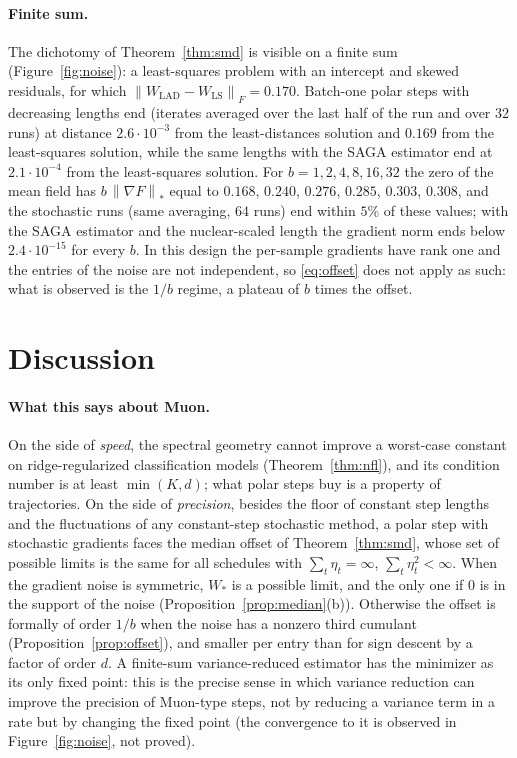 \documentclass[11pt]{article}
\newcommand{\nnuc}[1]{\left\|#1\right\|_{*}}
\newcommand{\nF}[1]{\left\|#1\right\|_{F}}
\begin{document}
\paragraph{Finite sum.} The dichotomy of Theorem~\ref{thm:smd} is visible on a finite sum
(Figure~\ref{fig:noise}): a least-squares problem with an intercept and skewed residuals, for which
$\nF{W_{\mathrm{LAD}}-W_{\mathrm{LS}}}=0.170$. Batch-one polar steps with decreasing lengths end (iterates averaged
over the last half of the run and over $32$ runs) at distance $2.6\cdot10^{-3}$ from the least-distances solution and
$0.169$ from the least-squares solution, while the same lengths with the SAGA estimator end at $2.1\cdot10^{-4}$ from
the least-squares solution. For $b=1,2,4,8,16,32$ the zero of the mean field has $b\,\nnuc{\nabla F}$ equal to
$0.168$, $0.240$, $0.276$, $0.285$, $0.303$, $0.308$, and the stochastic runs (same averaging, $64$ runs) end within
$5\%$ of these values; with the SAGA estimator and the nuclear-scaled length the gradient norm ends below
$2.4\cdot10^{-15}$ for every $b$. In this design the per-sample gradients have rank one and the entries of the noise
are not independent, so \eqref{eq:offset} does not apply as such: what is observed is the $1/b$ regime, a plateau of
$b$ times the offset.

\section{Discussion}\label{sec:discussion}

\paragraph{What this says about Muon.} On the side of \emph{speed}, the spectral geometry cannot improve a worst-case
constant on ridge-regularized classification models (Theorem~\ref{thm:nfl}), and its condition number is at least
$\min(K,d)$; what polar steps buy is a property of trajectories. On the side of \emph{precision}, besides the floor
of constant step lengths and the fluctuations of any constant-step stochastic method, a polar step with stochastic
gradients faces the median offset of Theorem~\ref{thm:smd}, whose set of possible limits is the same for all
schedules with $\sum_t\eta_t=\infty$, $\sum_t\eta_t^2<\infty$. When the gradient noise is symmetric, $W_\ast$ is a
possible limit, and the only one if $0$ is in the support of the noise (Proposition~\ref{prop:median}(b)). Otherwise
the offset is formally of order $1/b$ when the noise has a nonzero third cumulant (Proposition~\ref{prop:offset}),
and smaller per entry than for sign descent by a factor of order $d$. A finite-sum variance-reduced estimator has
the minimizer as its only fixed point: this is the precise sense in which variance reduction can improve the
precision of Muon-type steps, not by reducing a variance term in a rate but by changing the fixed point (the
convergence to it is observed in Figure~\ref{fig:noise}, not proved).
\end{document}
